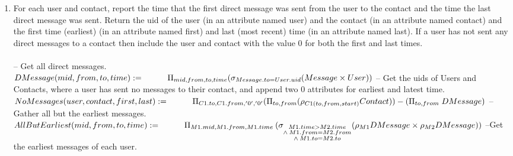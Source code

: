 \documentclass{article}
\begin{document}
\begin{enumerate}
{}
\item   %
For each user and contact, report the time that the first direct message was sent from the user to the contact and the time the last direct message was sent. Return the uid of the user (in an attribute named user) and the contact (in an attribute named contact) and the first time (earliest) (in an attribute named first) and last (most recent) time (in an attribute named last). If a user has not
sent any direct messages to a contact then include the user and contact with the value 0 for both the first and last times. \\\\ [5pt]
\large{
\hspace*{1cm} -- Get all direct messages. \\ [5pt]
$
DMessage(mid, from, to, time) := \\ [5pt] 
\hspace*{1cm} \Pi_{mid, from, to, time} (\sigma_{Message.to = User.uid} (Message \times User)) \\\\ [5pt]
$
\hspace*{1cm} -- Get the uids of Users and Contacts, where a user has sent no messages to their \hspace*{1cm} contact, and append two 0 attributes for earliest and latest time.  \\[5pt]
$
NoMessages(user, contact, first, last) :=  \\[5pt]
\hspace*{1cm} \Pi_{C1.to, C1.from, '0', '0'}(\Pi_{to, from} (\rho_{C1(to, from, start)}
			 Contact))  -  (\Pi_{to, from} \; DMessage) \\\\[5pt]
$
\hspace*{1cm} --Gather all but the earliest messages. \\[5pt]
$
AllButEarliest(mid, from, to, time) := \\
\hspace*{1cm} \Pi_{M1.mid, M1.from, M1.time} \: (\sigma_{\substack{M1.time>M2.time  \\
					\wedge \: M1.from = M2.from \\
					\wedge \: M1.to = M2.to}} (\rho_{M1} DMessage \times \rho_{M2} DMessage)) \\\\\\
$
\hspace*{1cm} --Get the earliest messages of each user.  \\[5pt]
}
\end{enumerate}
\end{document}
